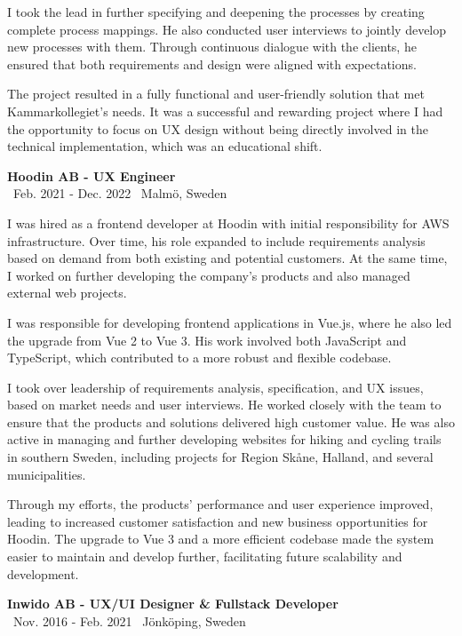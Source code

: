 \documentclass[a4paper,10pt]{article}
\begin{document}
I took the lead in further specifying and deepening the processes by creating complete process mappings. He also conducted user interviews to jointly develop new processes with them. Through continuous dialogue with the clients, he ensured that both requirements and design were aligned with expectations.

The project resulted in a fully functional and user-friendly solution that met Kammarkollegiet's needs. It was a successful and rewarding project where I had the opportunity to focus on UX design without being directly involved in the technical implementation, which was an educational shift.

\vspace{0.5cm}
\textbf{Hoodin AB - UX Engineer}\\
\normalsize \faCalendar \ Feb. 2021 - Dec. 2022 \quad \faMapMarker \ Malmö, Sweden

I was hired as a frontend developer at Hoodin with initial responsibility for AWS infrastructure. Over time, his role expanded to include requirements analysis based on demand from both existing and potential customers. At the same time, I worked on further developing the company's products and also managed external web projects.

I was responsible for developing frontend applications in Vue.js, where he also led the upgrade from Vue 2 to Vue 3. His work involved both JavaScript and TypeScript, which contributed to a more robust and flexible codebase.

I took over leadership of requirements analysis, specification, and UX issues, based on market needs and user interviews. He worked closely with the team to ensure that the products and solutions delivered high customer value. He was also active in managing and further developing websites for hiking and cycling trails in southern Sweden, including projects for Region Skåne, Halland, and several municipalities.

Through my efforts, the products' performance and user experience improved, leading to increased customer satisfaction and new business opportunities for Hoodin. The upgrade to Vue 3 and a more efficient codebase made the system easier to maintain and develop further, facilitating future scalability and development.

\vspace{0.5cm}
\textbf{Inwido AB - UX/UI Designer \& Fullstack Developer}\\
\normalsize \faCalendar \ Nov. 2016 - Feb. 2021 \quad \faMapMarker \ Jönköping, Sweden
\end{document}
